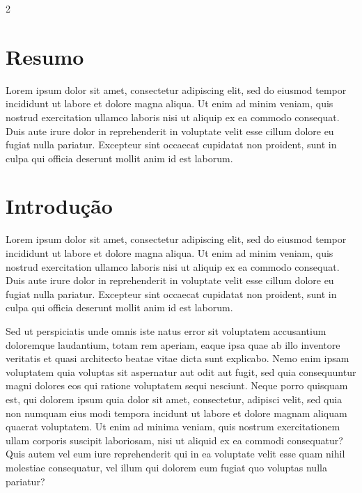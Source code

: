 \documentclass[a0,portrait]{a0poster}
\begin{document}
\begin{mdframed}[style=MyFrame]
\begin{multicols}{2}

\section{Resumo}
Lorem ipsum dolor sit amet, consectetur adipiscing elit, sed do eiusmod tempor incididunt ut labore et dolore magna aliqua. Ut enim ad minim veniam, quis nostrud exercitation ullamco laboris nisi ut aliquip ex ea commodo consequat. Duis aute irure dolor in reprehenderit in voluptate velit esse cillum dolore eu fugiat nulla pariatur. Excepteur sint occaecat cupidatat non proident, sunt in culpa qui officia deserunt mollit anim id est laborum.


\section{Introdução}\label{section:1}

Lorem ipsum dolor sit amet, consectetur adipiscing elit, sed do eiusmod tempor incididunt ut labore et dolore magna aliqua. Ut enim ad minim veniam, quis nostrud exercitation ullamco laboris nisi ut aliquip ex ea commodo consequat. Duis aute irure dolor in reprehenderit in voluptate velit esse cillum dolore eu fugiat nulla pariatur. Excepteur sint occaecat cupidatat non proident, sunt in culpa qui officia deserunt mollit anim id est laborum.

Sed ut perspiciatis unde omnis iste natus error sit voluptatem accusantium doloremque laudantium, totam rem aperiam, eaque ipsa quae ab illo inventore veritatis et quasi architecto beatae vitae dicta sunt explicabo. Nemo enim ipsam voluptatem quia voluptas sit aspernatur aut odit aut fugit, sed quia consequuntur magni dolores eos qui ratione voluptatem sequi nesciunt. Neque porro quisquam est, qui dolorem ipsum quia dolor sit amet, consectetur, adipisci velit, sed quia non numquam eius modi tempora incidunt ut labore et dolore magnam aliquam quaerat voluptatem. Ut enim ad minima veniam, quis nostrum exercitationem ullam corporis suscipit laboriosam, nisi ut aliquid ex ea commodi consequatur? Quis autem vel eum iure reprehenderit qui in ea voluptate velit esse quam nihil molestiae consequatur, vel illum qui dolorem eum fugiat quo voluptas nulla pariatur?



\end{multicols}
\end{mdframed}
\end{document}
